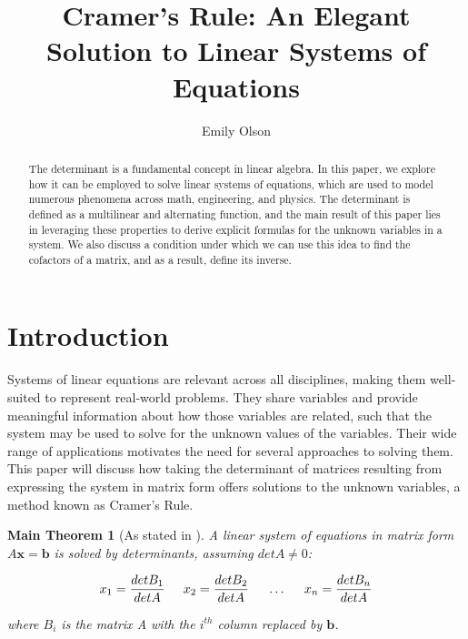 \documentclass[11pt,reqno]{amsart}
\title{Cramer's Rule: An Elegant Solution to Linear Systems of Equations}
\author{Emily Olson}
\newtheorem*{maintheorem}{Main Theorem}
\theoremstyle{definition}
\begin{document}
\maketitle
\setcounter{tocdepth}{1}
\begin{abstract}
   The determinant is a fundamental concept in linear algebra. In this paper, we explore how it can be employed to solve linear systems of equations, which are used to model numerous phenomena across math, engineering, and physics. The determinant is defined as a multilinear and alternating function, and the main result of this paper lies in leveraging these properties to derive explicit formulas for the unknown variables in a system. We also discuss a condition under which we can use this idea to find the cofactors of a matrix, and as a result, define its inverse.  
\end{abstract}

\section{Introduction}
\label{intro}

Systems of linear equations are relevant across all disciplines, making them well-suited to represent real-world problems. They share variables and provide meaningful information about how those variables are related, such that the system may be used to solve for the unknown values of the variables. Their wide range of applications motivates the need for several approaches to solving them. This paper will discuss how taking the determinant of matrices resulting from expressing the system in matrix form offers solutions to the unknown variables, a method known as Cramer's Rule.


\begin{maintheorem}[As stated in \cite{strang}]
\label{thm:main}
A linear system of equations in matrix form $A\mathbf{x}=\mathbf{b}$ is solved by determinants, assuming \(detA \neq 0\): 

\begin{equation} \label{cramers}
    x_1=\frac{detB_1}{detA}\hspace{0.5cm} x_2 = \frac{detB_2}{detA}\hspace{0.5cm} \dots\hspace{0.5cm}x_n = \frac{detB_n}{detA}
\end{equation}

where $B_i$ is the matrix A with the $i^{th}$ column replaced by $\mathbf{b}$.
\end{maintheorem}
\end{document}
